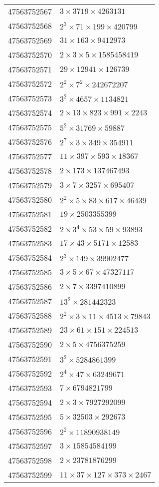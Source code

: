 \documentclass[12pt]{article}
\begin{document}
\begin{tabular}{|r|l|}
47563752567 & $3 \times 3719 \times 4263131$ \\
47563752568 & $2^3 \times 71 \times 199 \times 420799$ \\
47563752569 & $31 \times 163 \times 9412973$ \\
47563752570 & $2 \times 3 \times 5 \times 1585458419$ \\
47563752571 & $29 \times 12941 \times 126739$ \\
47563752572 & $2^2 \times 7^2 \times 242672207$ \\
47563752573 & $3^2 \times 4657 \times 1134821$ \\
47563752574 & $2 \times 13 \times 823 \times 991 \times 2243$ \\
47563752575 & $5^2 \times 31769 \times 59887$ \\
47563752576 & $2^7 \times 3 \times 349 \times 354911$ \\
47563752577 & $11 \times 397 \times 593 \times 18367$ \\
47563752578 & $2 \times 173 \times 137467493$ \\
47563752579 & $3 \times 7 \times 3257 \times 695407$ \\
47563752580 & $2^2 \times 5 \times 83 \times 617 \times 46439$ \\
47563752581 & $19 \times 2503355399$ \\
47563752582 & $2 \times 3^4 \times 53 \times 59 \times 93893$ \\
47563752583 & $17 \times 43 \times 5171 \times 12583$ \\
47563752584 & $2^3 \times 149 \times 39902477$ \\
47563752585 & $3 \times 5 \times 67 \times 47327117$ \\
47563752586 & $2 \times 7 \times 3397410899$ \\
47563752587 & $13^2 \times 281442323$ \\
47563752588 & $2^2 \times 3 \times 11 \times 4513 \times 79843$ \\
47563752589 & $23 \times 61 \times 151 \times 224513$ \\
47563752590 & $2 \times 5 \times 4756375259$ \\
47563752591 & $3^2 \times 5284861399$ \\
47563752592 & $2^4 \times 47 \times 63249671$ \\
47563752593 & $7 \times 6794821799$ \\
47563752594 & $2 \times 3 \times 7927292099$ \\
47563752595 & $5 \times 32503 \times 292673$ \\
47563752596 & $2^2 \times 11890938149$ \\
47563752597 & $3 \times 15854584199$ \\
47563752598 & $2 \times 23781876299$ \\
47563752599 & $11 \times 37 \times 127 \times 373 \times 2467$ \\
\end{tabular} 
\end{document}
